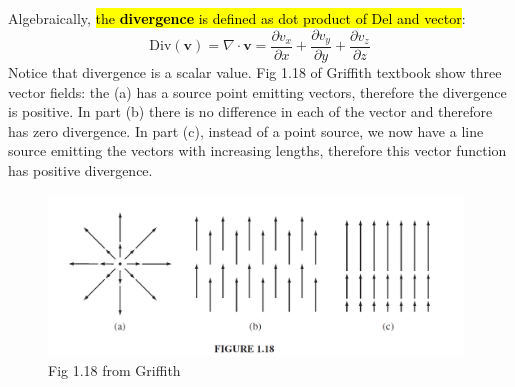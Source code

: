 \documentclass[12pt,a4paper,twoside]{article}
\numberwithin{equation}{section}
\begin{document}
	\noindent Algebraically, \hl{the \textbf{divergence} is defined as dot product of Del and vector}:
	\begin{equation}
		\mathrm{Div(\textbf{v})}=\nabla\cdot\textbf{v} = \frac{\partial v_x}{\partial x}+\frac{\partial v_y}{\partial y}+\frac{\partial v_z}{\partial z}
	\end{equation}
	Notice that divergence is a scalar value. Fig 1.18 of Griffith textbook show three vector fields: the (a) has a source point emitting vectors,  therefore the divergence is positive. In part (b) there is no difference in each of the vector and therefore has zero divergence. In part (c), instead of a point source, we now have a line source emitting the vectors with increasing lengths, therefore this vector function has positive divergence.
	\begin{figure}[h]
		\centering
		\includegraphics[width=11cm]{divergence.png}
		\caption{Fig 1.18 from Griffith}
		\label{fig:1.18}
	\end{figure}
	
\end{document}
